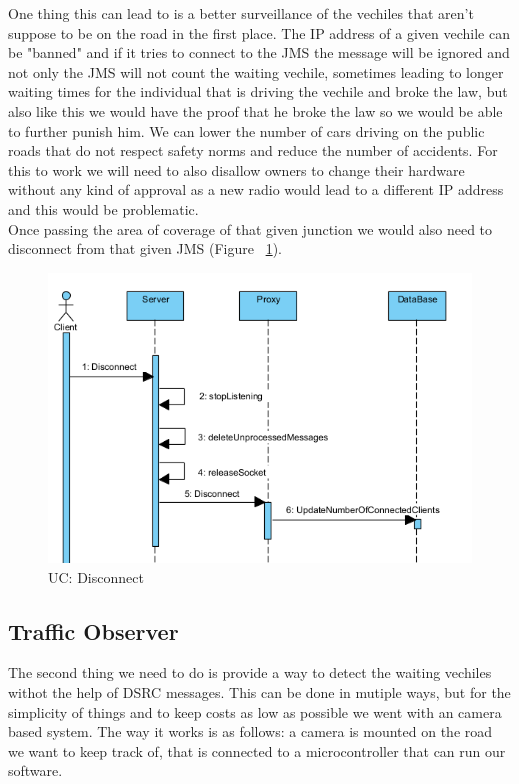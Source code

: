 \documentclass[17pt]{article}
\begin{document}
\pagebreak

One thing this can lead to is a 
better surveillance of the vechiles that aren't suppose to be on the 
road in the first place. The IP address of a given vechile can be "banned"
and if it tries to connect to the JMS the message will be ignored
and not only the JMS will not count the waiting vechile, sometimes 
leading to longer waiting times for the individual that is driving the
vechile and broke the law, but also like this we would have the proof
that he broke the law so we would be able to further punish him. We can lower the number of cars driving on the public
roads that do not respect safety norms and reduce the number of
accidents. For this to work we will need to also disallow owners to 
change their hardware without any kind of approval as a new radio
would lead to a different IP address and this would be problematic.\\
\indent \indent 
Once passing the area of coverage of that given junction we would also need
to disconnect from that given JMS (Figure ~\ref{fig:UC_Disconnect}).


\begin{figure}[h!]
    \includegraphics[width=\textwidth]{UC/Disconnect.png}
    \caption{UC: Disconnect}
    \label{fig:UC_Disconnect}
\end{figure}

\pagebreak

\subsection{Traffic Observer}
\indent \indent
The second thing we need to do is provide a way to detect the
waiting vechiles withot the help of DSRC messages. This can be
done in mutiple ways, but for the simplicity of things and to keep
costs as low as possible we went with an camera based system.
The way it works is as follows: a camera is mounted on the road we 
want to keep track of, that is connected to a microcontroller that can 
run our software.
\end{document}
